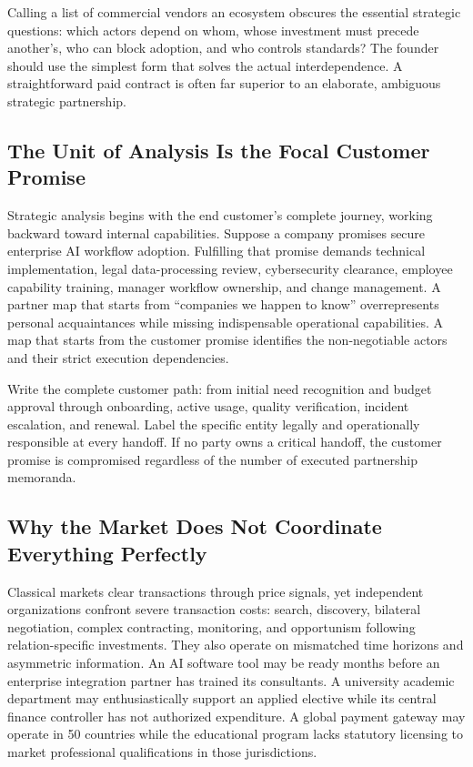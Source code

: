 Calling a list of commercial vendors an ecosystem obscures the essential strategic questions: which actors depend on whom, whose investment must precede another's, who can block adoption, and who controls standards? The founder should use the simplest form that solves the actual interdependence. A straightforward paid contract is often far superior to an elaborate, ambiguous strategic partnership.

\subsection{The Unit of Analysis Is the Focal Customer Promise}
\label{sec:unit_of_analysis_customer_promise}

Strategic analysis begins with the end customer's complete journey, working backward toward internal capabilities. Suppose a company promises secure enterprise AI workflow adoption. Fulfilling that promise demands technical implementation, legal data-processing review, cybersecurity clearance, employee capability training, manager workflow ownership, and change management. A partner map that starts from ``companies we happen to know'' overrepresents personal acquaintances while missing indispensable operational capabilities. A map that starts from the customer promise identifies the non-negotiable actors and their strict execution dependencies.

Write the complete customer path: from initial need recognition and budget approval through onboarding, active usage, quality verification, incident escalation, and renewal. Label the specific entity legally and operationally responsible at every handoff. If no party owns a critical handoff, the customer promise is compromised regardless of the number of executed partnership memoranda.

\subsection{Why the Market Does Not Coordinate Everything Perfectly}
\label{sec:transaction_costs_and_market_limits}

Classical markets clear transactions through price signals, yet independent organizations confront severe transaction costs: search, discovery, bilateral negotiation, complex contracting, monitoring, and opportunism following relation-specific investments. They also operate on mismatched time horizons and asymmetric information. An AI software tool may be ready months before an enterprise integration partner has trained its consultants. A university academic department may enthusiastically support an applied elective while its central finance controller has not authorized expenditure. A global payment gateway may operate in 50 countries while the educational program lacks statutory licensing to market professional qualifications in those jurisdictions.

